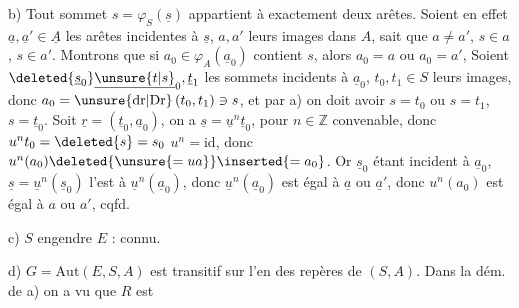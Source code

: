 b) Tout sommet $s=\varphi_S(\underline{s})$ appartient à
exactement deux arêtes. Soient en effet
$\underline a,\underline a'\in\underline A$ les arêtes incidentes à $\underline s$, $a,a'$
leurs images dans $A$,  sait que $a\ne a'$,
$s\in a$, $s\in a'$. Montrons que si $a_0\in\varphi_A(\underline a_0)$
 contient $s$, alors $a_0=a$ ou $a_0=a'$,
 Soient $\deleted{\underline s_0}\underline{\unsure{t|s}}_0,\underline t_1$ les sommets incidents
à $\underline a_0$,  $t_0,t_1\in S$ leurs images, donc
  $a_0=\text{\unsure{dr|Dr}}\,(t_0,t_1)\ni s$, et par a) on
doit avoir  $s=t_0$ ou $s=t_1$, 
 $s=\underline t_0$. Soit $\underline r=(\underline t_0,\underline a_0)$,
on a $\underline s=\underline u^{n}\underline t_0$, pour $n\in\mathbb Z$ convenable,
donc $u^nt_0=\deleted{s}=s_0$  $u^n=\mathrm{id}$, donc
 $u^n(a_0)\deleted{\unsure{=ua}} \inserted{=a_0}$. Or $\underline{s}_0$ étant incident
à $\underline a_0$, $\underline s=\underline u^n(\underline s_0)$ l'est à $\underline u^n(\underline a_0)$, donc
$\underline u^n(\underline a_0)$  est égal à $\underline a$ ou $\underline a'$, donc
$u^n(a_0)$  est égal à $a$ ou $a'$,  cqfd.

c)  $S$ engendre $E$ : connu.

d) $G=\mathrm{Aut}(E,S,A)$ est transitif sur
l'en des repères de $(S,A)$. Dans
la dém. de a)  on a vu que $R$ est
